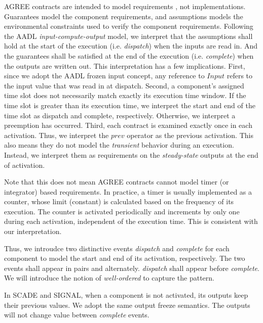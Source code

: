 AGREE contracts are intended to model requirements \cite{AGREE2}, not implementations. Guarantees model the component requirements, and assumptions models the environmental constraints used to verify the component requirements. Following the AADL \emph{input-compute-output} model, we interpret that the assumptions shall hold at the start of the execution (i.e. \emph{dispatch}) when the inputs are read in. And the guarantees shall be satisfied at the end of the execution (i.e. \emph{complete}) when the outputs are written out. This interpretation has a few implications. 
First, since we adopt the AADL frozen input concept, any reference to $Input$ refers to the input value that was read in at dispatch.
Second, a component's assigned time slot does not necessarily match exactly its execution time window. If the time slot is greater than its execution time, we interpret the start and end of the time slot as dispatch and complete, respectively. Otherwise, we interpret a preemption has occurred.
Third, each contract is examined exactly once in each activation. Thus, we interpret the $prev$ operator as the previous activation. 
This also means they do not model the \emph{transient} behavior during an execution. Instead, we interpret them as requirements on the \emph{steady-state} outputs at the end of activation.

Note that this does not mean AGREE contracts cannot model timer (or integrator) based requirements. In practice, a timer is usually implemented as a counter, whose limit (constant) is calculated based on the frequency of its execution. The counter is activated periodically and increments by only one during each activation, independent of the execution time. This is consistent with our interpretation.

Thus, we introudce two distinctive events \emph{dispatch} and \emph{complete} for each component to model the start and end of its activation, respectively. 
The two events shall appear in pairs and alternately. \emph{dispatch} shall appear before \emph{complete}. We will introduce the notion of \emph{well-ordered} to capture the pattern.

In SCADE and SIGNAL, when a component is not activated, its outputs keep their previous values. We adopt the same output freeze semantics. The outputs will not change value between \emph{complete} events. 

